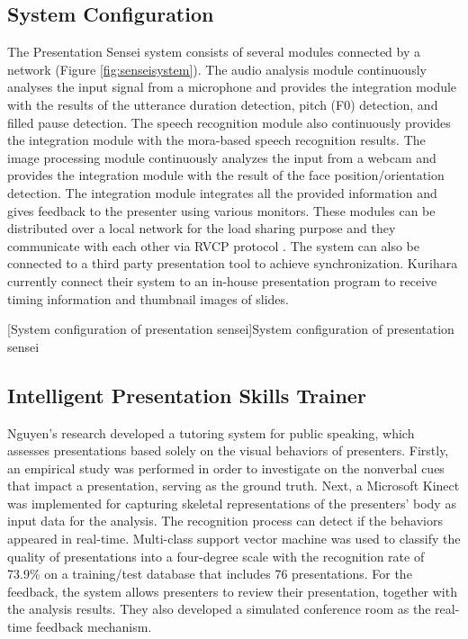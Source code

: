 \subsection*{System Configuration}
\par The Presentation Sensei system consists of several modules connected by a network (Figure \ref{fig:senseisystem}). The audio analysis module continuously analyses the input signal from a microphone and provides the integration module with the results of the utterance duration detection, pitch (F0) detection, and filled pause detection. The speech recognition module also continuously provides the integration module with the mora-based speech recognition results. The image processing module continuously analyzes the input from a webcam and provides the integration module with the result of the face position/orientation detection. The integration module integrates all the provided information and gives feedback to the presenter using various monitors. These modules can be distributed over a local network for the load sharing purpose and they communicate with each other via RVCP protocol \cite{Goto2001}. The system can also be connected to a third party presentation tool to achieve synchronization. Kurihara currently connect their system to an in-house presentation program to receive timing information and thumbnail images of slides.

[System configuration of presentation sensei]{System configuration of presentation sensei \cite{Kurihara2007}}

\subsection{Intelligent Presentation Skills Trainer}
\par Nguyen's research developed a tutoring system for public speaking, which assesses presentations based solely on the visual behaviors of presenters. Firstly, an empirical study was performed in order to investigate on the nonverbal cues that impact a presentation, serving as the ground truth. Next, a Microsoft Kinect was implemented for capturing skeletal representations of the presenters' body as input data for the analysis. The recognition process can detect if the behaviors appeared in real-time. Multi-class support vector machine was used to classify the quality of presentations into a four-degree scale with the recognition rate of 73.9\% on a training/test database that includes 76 presentations. For the feedback, the system allows presenters to review their presentation, together with the analysis results. They also developed a simulated conference room as the real-time feedback mechanism.
